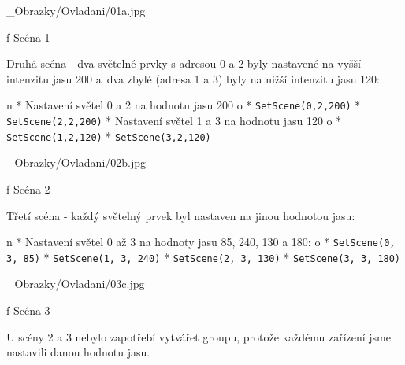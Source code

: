 \medskip {}
\picw=6cm _Obrazky/Ovladani/01a.jpg
\caption/f Scéna 1
\medskip

\noindent
{\sbf Druhá scéna} - dva světelné prvky s adresou 0 a 2 byly nastavené na vyšší intenzitu jasu 200
a~dva zbylé (adresa 1 a 3) byly na nižší intenzitu jasu 120:

\begitems \style n
* {\sbf Nastavení} světel 0 a 2 na hodnotu jasu 200
    \begitems \style o
        * {\tt SetScene(0,2,200)}
        * {\tt SetScene(2,2,200)}
    \enditems
* {\sbf Nastavení} světel 1 a 3 na hodnotu jasu 120
    \begitems \style o
        * {\tt SetScene(1,2,120)}
        * {\tt SetScene(3,2,120)}
    \enditems

\enditems

\medskip {}
\picw=6cm _Obrazky/Ovladani/02b.jpg
\caption/f Scéna 2
\medskip

\noindent
{\sbf Třetí scéna} - každý světelný prvek byl nastaven na jinou hodnotou jasu:


\begitems \style n
* {\sbf Nastavení} světel 0 až 3 na hodnoty jasu 85, 240, 130 a 180:
    \begitems \style o
        * {\tt SetScene(0, 3, 85)}
        * {\tt SetScene(1, 3, 240)}
        * {\tt SetScene(2, 3, 130)}
        * {\tt SetScene(3, 3, 180)}
    \enditems

\enditems

\medskip {}
\picw=6cm _Obrazky/Ovladani/03c.jpg
\caption/f Scéna 3
\medskip

\noindent U scény 2 a 3 nebylo zapotřebí vytvářet groupu, protože každému zařízení jsme nastavili danou hodnotu jasu.


